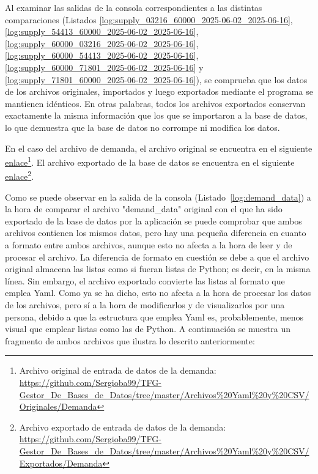 


Al examinar las salidas de la consola correspondientes a las distintas comparaciones (Listados \ref{log:supply_03216_60000_2025-06-02_2025-06-16}, \ref{log:supply_54413_60000_2025-06-02_2025-06-16}, \ref{log:supply_60000_03216_2025-06-02_2025-06-16}, \ref{log:supply_60000_54413_2025-06-02_2025-06-16}, \ref{log:supply_60000_71801_2025-06-02_2025-06-16} y \ref{log:supply_71801_60000_2025-06-02_2025-06-16}), se comprueba que los datos de los archivos originales, importados y luego exportados mediante el programa se mantienen idénticos. En otras palabras, todos los archivos exportados conservan exactamente la misma información que los que se importaron a la base de datos, lo que demuestra que la base de datos no corrompe ni modifica los datos.

En el caso del archivo de demanda, el archivo original se encuentra en el siguiente \href{https://github.com/Sergioba99/TFG-Gestor_De_Bases_de_Datos/tree/master/Archivos%20Yaml%20y%20CSV/Originales/Demanda}{enlace}\footnote{Archivo original de entrada de datos de la demanda: \url{https://github.com/Sergioba99/TFG-Gestor\_De\_Bases\_de\_Datos/tree/master/Archivos\%20Yaml\%20y\%20CSV/Originales/Demanda}}. El archivo exportado de la base de datos se encuentra en el siguiente \href{https://github.com/Sergioba99/TFG-Gestor_De_Bases_de_Datos/tree/master/Archivos%20Yaml%20y%20CSV/Exportados/Demanda}{enlace}\footnote{Archivo exportado de entrada de datos de la demanda: \url{https://github.com/Sergioba99/TFG-Gestor\_De\_Bases\_de\_Datos/tree/master/Archivos\%20Yaml\%20y\%20CSV/Exportados/Demanda}}. 




Como se puede observar en la salida de la consola (Listado~\ref{log:demand_data}) a la hora de comparar el archivo "demand\_data" original con el que ha sido exportado de la base de datos por la aplicación se puede comprobar que ambos archivos contienen los mismos datos, pero hay una pequeña diferencia en cuanto a formato entre ambos archivos, aunque esto no afecta a la hora de leer y de procesar el archivo. La diferencia de formato en cuestión se debe a que el archivo original almacena las listas como si fueran listas de Python; es decir, en la misma línea. Sin embargo, el archivo exportado convierte las listas al formato que emplea \acrshort{Yaml}. Como ya se ha dicho, esto no afecta a la hora de procesar los datos de los archivos, pero sí a la hora de modificarlos y de visualizarlos por una persona, debido a que la estructura que emplea \acrshort{Yaml} es, probablemente, menos visual que emplear listas como las de Python. A continuación se muestra un fragmento de ambos archivos que ilustra lo descrito anteriormente:

